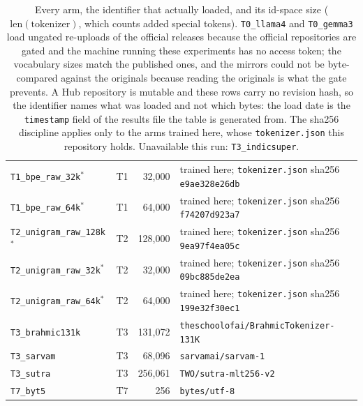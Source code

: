 \begin{table}[t]
\begin{tabular}{llrl}
\texttt{T1\_bpe\_raw\_32k}$^{*}$ & T1 & 32,000 & trained here; \texttt{tokenizer.json} sha256 \texttt{e9ae328e26db} \\
\texttt{T1\_bpe\_raw\_64k}$^{*}$ & T1 & 64,000 & trained here; \texttt{tokenizer.json} sha256 \texttt{f74207d923a7} \\
\texttt{T2\_unigram\_raw\_128k}$^{*}$ & T2 & 128,000 & trained here; \texttt{tokenizer.json} sha256 \texttt{9ea97f4ea05c} \\
\texttt{T2\_unigram\_raw\_32k}$^{*}$ & T2 & 32,000 & trained here; \texttt{tokenizer.json} sha256 \texttt{09bc885de2ea} \\
\texttt{T2\_unigram\_raw\_64k}$^{*}$ & T2 & 64,000 & trained here; \texttt{tokenizer.json} sha256 \texttt{199e32f30ec1} \\
\texttt{T3\_brahmic131k} & T3 & 131,072 & \texttt{theschoolofai/BrahmicTokenizer-131K} \\
\texttt{T3\_sarvam} & T3 & 68,096 & \texttt{sarvamai/sarvam-1} \\
\texttt{T3\_sutra} & T3 & 256,061 & \texttt{TWO/sutra-mlt256-v2} \\
\texttt{T7\_byt5} & T7 & 256 & \texttt{bytes/utf-8} \\
\bottomrule
\end{tabular}
\caption{Every arm, the identifier that actually loaded, and its id-space size ($\mathrm{len}(\mathrm{tokenizer})$, which counts added special tokens). \texttt{T0\_llama4} and \texttt{T0\_gemma3} load ungated re-uploads of the official releases because the official repositories are gated and the machine running these experiments has no access token; the vocabulary sizes match the published ones, and the mirrors could not be byte-compared against the originals because reading the originals is what the gate prevents. A Hub repository is mutable and these rows carry no revision hash, so the identifier names what was loaded and not which bytes: the load date is the \texttt{timestamp} field of the results file the table is generated from. The sha256 discipline applies only to the arms trained here, whose \texttt{tokenizer.json} this repository holds. Unavailable this run: \texttt{T3\_indicsuper}.}
\label{tab:arms}
\end{table}
